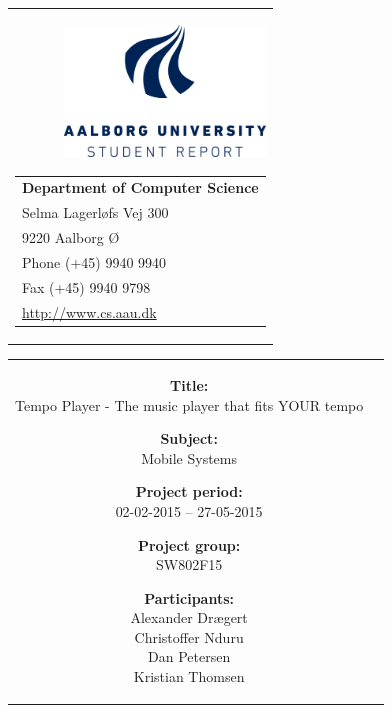 \begin{nopagebreak}
	{\samepage 
		\begin{tabular}{r}
			\parbox{16cm}
			{\raisebox{11mm}
				{\includegraphics[height=3.5cm]{Addendum/TitlePage/aauIcon.png}}
				\hfill \parbox{8.5cm}{\vspace{-5cm}
				\begin{tabular}{l}
					{\small \textbf{Department of Computer Science}}\\
					{\small Selma Lagerløfs Vej 300} \\
					{\small 9220 Aalborg Ø} \\
					{\small Phone (+45) 9940 9940} \\
					{\small Fax (+45) 9940 9798} \\
					{\small \url{http://www.cs.aau.dk}}
				\end{tabular}}
			}
		\end{tabular}
		
		\begin{tabular}{cc}
			\parbox{7cm}{
				\begin{description}
					\item {\textbf{Title:}} \\
						Tempo Player - The music player that fits YOUR tempo\\
					
					\item {\textbf{Subject:}} \\
						Mobile Systems\\	
						
					\item {\textbf{Project period:}}\\
						  02-02-2015 -- 27-05-2015\\

					\item {\textbf{Project group:}}\\
						  SW802F15\\
			
					\item {\textbf{Participants:}}\\
						Alexander Drægert\\
						Christoffer Nduru\\
						Dan Petersen\\
						Kristian Thomsen \\
						  

\end{description}}
\end{tabular}}
\end{nopagebreak}
